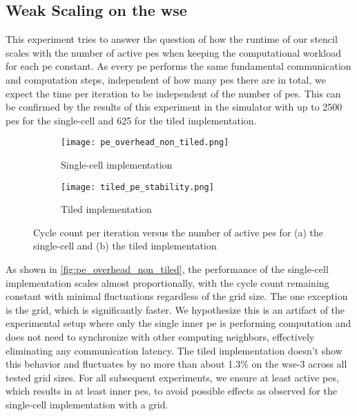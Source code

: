 \subsection{Weak Scaling on the \ac{wse}}
\label{sec:weak_scaling}
This experiment tries to answer the question of how the runtime of our stencil scales with the number of active \acp{pe} when keeping the computational workload for each \ac{pe} constant.
As every \ac{pe} performs the same fundamental communication and computation steps, independent of how many \acp{pe} there are in total, we expect the time per iteration to be independent of the number of \acp{pe}.
This can be confirmed by the results of this experiment in the simulator with up to \num{2500} \acp{pe} for the single-cell and \num{625} for the tiled implementation.

\begin{figure}[h]
    \centering
    \begin{subfigure}[b]{0.48\textwidth}
        \centering
        \texttt{[image: pe\_overhead\_non\_tiled.png]}
        \caption{Single-cell implementation}
        \label{fig:pe_overhead_non_tiled}
    \end{subfigure}
    \hfill
    \begin{subfigure}[b]{0.48\textwidth}
        \centering
        \texttt{[image: tiled\_pe\_stability.png]}
        \caption{Tiled implementation}
        \label{fig:tiled_pe_stability}
    \end{subfigure}
    \caption{Cycle count per iteration versus the number of active \acp{pe} for (a) the single-cell and (b) the tiled implementation}
    \label{fig:pe_overhead}
\end{figure}

As shown in \autoref{fig:pe_overhead_non_tiled}, the performance of the single-cell implementation scales almost proportionally, with the cycle count remaining constant with minimal fluctuations regardless of the grid size. The one exception is the  grid, which is significantly faster. We hypothesize this is an artifact of the experimental setup where only the single inner \ac{pe} is performing computation and does not need to synchronize with other computing neighbors, effectively eliminating any communication latency.
The tiled implementation doesn't show this behavior and fluctuates by no more than about 1.3\% on the \ac{wse}-3 across all tested grid sizes.
For all subsequent experiments, we ensure at least  active \acp{pe}, which results in at least  inner \acp{pe}, to avoid possible effects as observed for the single-cell implementation with a  grid. 


